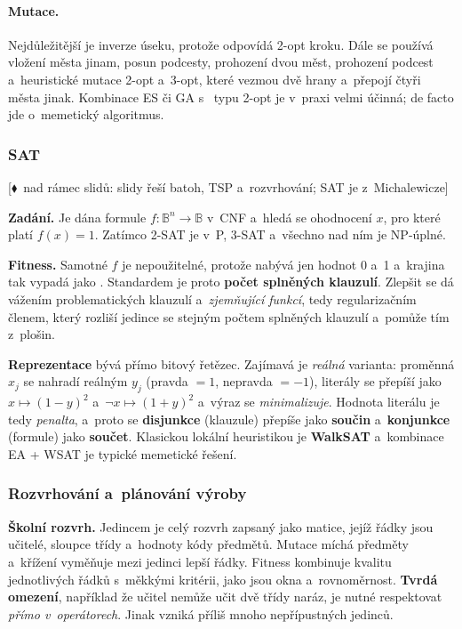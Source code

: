 \documentclass[11pt,a4paper]{article}
\theoremstyle{definition}
\newcommand{\mimoq}[1]{\textcolor{markcol}{\textsf{\footnotesize[$\blacklozenge$~nad rámec slidů: #1]}}}
\begin{document}
\paragraph{Mutace.} Nejdůležitější je inverze úseku, protože odpovídá 2-opt kroku. Dále se
používá vložení města jinam, posun podcesty, prohození dvou měst, prohození podcest
a~heuristické mutace 2-opt a~3-opt, které vezmou dvě hrany a~přepojí čtyři města jinak.
Kombinace ES či GA s~ typu 2-opt je v~praxi velmi
účinná; de facto jde o~memetický algoritmus.

\subsubsection{SAT}

\noindent\mimoq{slidy řeší batoh, TSP a~rozvrhování; SAT je z~Michalewicze}

\textbf{Zadání.} Je dána formule $f: \mathbb{B}^n \to \mathbb{B}$ v~CNF a~hledá se
ohodnocení $x$, pro které platí $f(x)=1$. Zatímco 2-SAT je v~P, 3-SAT a~všechno nad ním
je NP-úplné.

\textbf{Fitness.} Samotné $f$ je nepoužitelné, protože nabývá jen hodnot 0 a~1 a~krajina
tak vypadá jako . Standardem je proto \textbf{počet splněných
klauzulí}. Zlepšit se dá vážením problematických klauzulí a~\emph{zjemňující funkcí}, tedy
regularizačním členem, který rozliší jedince se stejným počtem splněných klauzulí a~pomůže
tím z~plošin.

\textbf{Reprezentace} bývá přímo bitový řetězec. Zajímavá je \emph{reálná} varianta:
proměnná $x_j$ se nahradí reálným $y_j$ (pravda $=1$, nepravda $=-1$), literály se přepíší
jako $x \mapsto (1-y)^2$ a~$\neg x \mapsto (1+y)^2$ a~výraz se \emph{minimalizuje}. Hodnota
literálu je tedy \emph{penalta}, a~proto se \textbf{disjunkce} (klauzule) přepíše jako
\textbf{součin} a~\textbf{konjunkce} (formule) jako \textbf{součet}. Klasickou lokální
heuristikou je \textbf{WalkSAT} a~kombinace EA + WSAT je typické memetické řešení.

\subsubsection{Rozvrhování a~plánování výroby}

\textbf{Školní rozvrh.} Jedincem je celý rozvrh zapsaný jako matice, jejíž řádky jsou
učitelé, sloupce třídy a~hodnoty kódy předmětů. Mutace míchá předměty a~křížení vyměňuje
mezi jedinci lepší řádky. Fitness kombinuje kvalitu jednotlivých řádků s~měkkými kritérii,
jako jsou okna a~rovnoměrnost. \textbf{Tvrdá omezení}, například že učitel nemůže učit dvě
třídy naráz, je nutné respektovat \emph{přímo v~operátorech}. Jinak vzniká příliš mnoho
nepřípustných jedinců.
\end{document}
